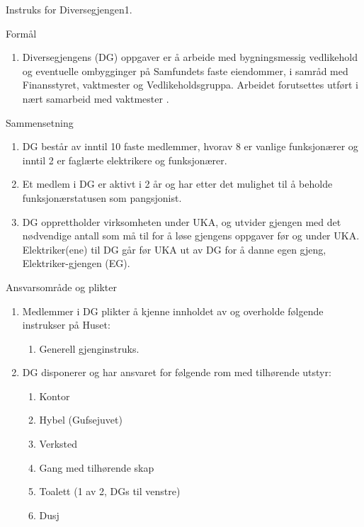
\begin{instruks}{Instruks for Diversegjengen}{1. }{ }

    \begin{instruksledd}{Formål}
        \begin{enumerate}
            \item Diversegjengens (DG) oppgaver er å arbeide med bygningsmessig vedlikehold og eventuelle
                ombygginger på Samfundets faste eiendommer, i samråd med Finansstyret, vaktmester og Vedlikeholdsgruppa.
                Arbeidet forutsettes utført i nært samarbeid med vaktmester .
        \end{enumerate}
    \end{instruksledd}

    \begin{instruksledd}{Sammensetning}
        \begin{enumerate}
            \item DG består av inntil 10 faste medlemmer, hvorav 8 er vanlige funksjonærer og inntil 2 er
                faglærte elektrikere og funksjonærer.
            \item Et medlem i DG er aktivt i 2 år og har etter det mulighet til å beholde
                funksjonærstatusen som pangsjonist.
            \item DG opprettholder virksomheten under UKA, og utvider gjengen med det nødvendige antall
                som må til for å løse gjengens oppgaver før og under UKA. Elektriker(ene) til DG går før UKA ut av DG for å
                danne egen gjeng, Elektriker-gjengen (EG).
        \end{enumerate}
    \end{instruksledd}

    \begin{instruksledd}{Ansvarsområde og plikter}
        \begin{enumerate}   
            \item  Medlemmer i DG plikter å kjenne innholdet av og overholde følgende instrukser på Huset:
                \begin{enumerate}
                    \item Generell gjenginstruks.
                \end{enumerate}
            \item DG disponerer og har ansvaret for følgende rom med tilhørende utstyr:
                \begin{enumerate}
                    \item Kontor
                    \item Hybel (Gufsejuvet)
                    \item Verksted
                    \item Gang med tilhørende skap
                    \item Toalett (1 av 2, DGs til venstre)
                    \item  Dusj
                \end{enumerate}
        \end{enumerate}
    \end{instruksledd}


\end{instruks}
